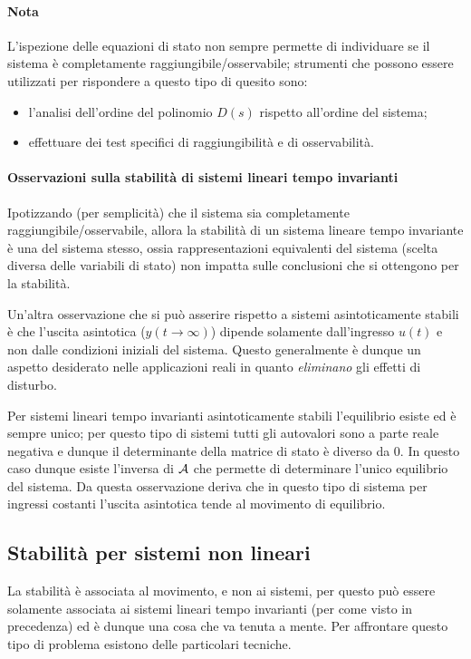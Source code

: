		\paragraph{Nota} L'ispezione delle equazioni di stato non sempre permette di individuare se il sistema è completamente raggiungibile/osservabile;  strumenti che possono essere utilizzati per rispondere a questo tipo di quesito sono:
		\begin{itemize}
			\item l'analisi dell'ordine del polinomio $D(s)$ rispetto all'ordine del sistema;
			\item effettuare dei test specifici di raggiungibilità e di osservabilità.
		\end{itemize}
	
		\paragraph{Osservazioni sulla stabilità di sistemi lineari tempo invarianti} Ipotizzando (per semplicità) che il sistema sia completamente raggiungibile/osservabile, allora la stabilità di un sistema lineare tempo invariante è una  del sistema stesso, ossia rappresentazioni equivalenti del sistema (scelta diversa delle variabili di stato) non impatta sulle conclusioni che si ottengono per la stabilità.
		
		Un'altra osservazione che si può asserire rispetto a sistemi asintoticamente stabili è che l'uscita asintotica ($y(t\rightarrow\infty)$) dipende solamente dall'ingresso $u(t)$ e non dalle condizioni iniziali del sistema. Questo generalmente è dunque un aspetto desiderato nelle applicazioni reali in quanto \textit{eliminano} gli effetti di disturbo.
		
		Per sistemi lineari tempo invarianti asintoticamente stabili l'equilibrio esiste ed è sempre unico; per questo tipo di sistemi tutti gli autovalori sono a parte reale negativa e dunque il determinante della matrice di stato è diverso da $0$. In questo caso dunque esiste l'inversa di $\mathcal A$ che permette di determinare l'unico equilibrio del sistema. Da questa osservazione deriva che in questo tipo di sistema per ingressi costanti l'uscita asintotica tende al movimento di equilibrio.
		
	\subsection{Stabilità per sistemi non lineari}
		La stabilità è associata al movimento, e non ai sistemi, per questo può essere solamente associata ai sistemi lineari tempo invarianti (per come visto in precedenza) ed è dunque una cosa che va tenuta a mente. Per affrontare questo tipo di problema esistono delle particolari tecniche.
		
